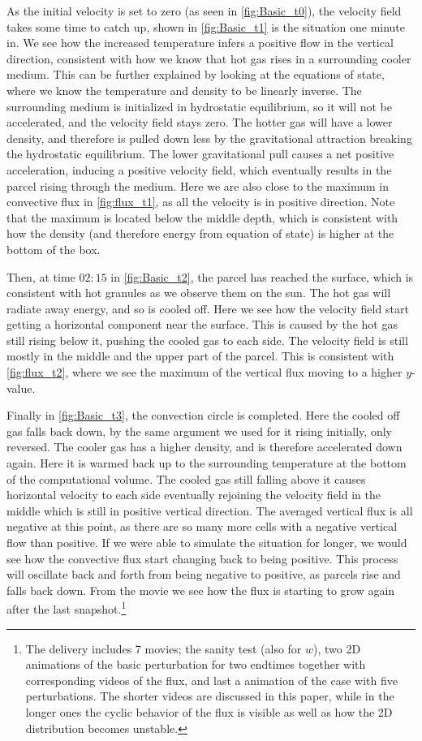 \documentclass[11pt,a4paper,twocolumn,titlepage]{article}
\begin{document}
As the initial velocity is set to zero (as seen in \ref{fig:Basic_t0}), the velocity field takes some time to catch up, shown in \ref{fig:Basic_t1} is the situation one minute in. We see how the increased temperature infers a positive flow in the vertical direction, consistent with how we know that hot gas rises in a surrounding cooler medium. This can be further explained by looking at the equations of state, where we know the temperature and density to be linearly inverse. The surrounding medium is initialized in hydrostatic equilibrium, so it will not be accelerated, and the velocity field stays zero. The hotter gas will have a lower density, and therefore is pulled down less by the gravitational attraction breaking the hydrostatic equilibrium. The lower gravitational pull causes a net positive acceleration, inducing a positive velocity field, which eventually results in the parcel rising through the medium. Here we are also close to the maximum in convective flux in \cref{fig:flux_t1}, as all the velocity is in positive direction. Note that the maximum is located below the middle depth, which is consistent with how the density (and therefore energy from equation of state) is higher at the bottom of the box.

Then, at time $02:15$ in \ref{fig:Basic_t2}, the parcel has reached the surface, which is consistent with hot granules as we observe them on the sun. The hot gas will radiate away energy, and so is cooled off. Here we see how the velocity field start getting a horizontal component near the surface. This is caused by the hot gas still rising below it, pushing the cooled gas to each side. The velocity field is still mostly in the middle and the upper part of the parcel. This is consistent with \cref{fig:flux_t2}, where we see the maximum of the vertical flux moving to a higher $y$-value.

Finally in \ref{fig:Basic_t3}, the convection circle is completed. Here the cooled off gas falls back down, by the same argument we used for it rising initially, only reversed. The cooler gas has a higher density, and is therefore accelerated down again. Here it is warmed back up to the surrounding temperature at the bottom of the computational volume. The cooled gas still falling above it causes horizontal velocity to each side eventually rejoining the velocity field in the middle which is still in positive vertical direction. The averaged vertical flux is all negative at this point, as there are so many more cells with a negative vertical flow than positive. If we were able to simulate the situation for longer, we would see how the convective flux start changing back to being positive. This process will oscillate back and forth from being negative to positive, as parcels rise and falls back down. From the movie we see how the flux is starting to grow again after the last snapshot.\footnote{The delivery includes 7 movies; the sanity test (also for $w$), two 2D animations of the basic perturbation for two endtimes together with corresponding videos of the flux, and last a animation of the case with five perturbations. The shorter videos are discussed in this paper, while in the longer ones the cyclic behavior of the flux is visible as well as how the 2D distribution becomes unstable.}
\end{document}
